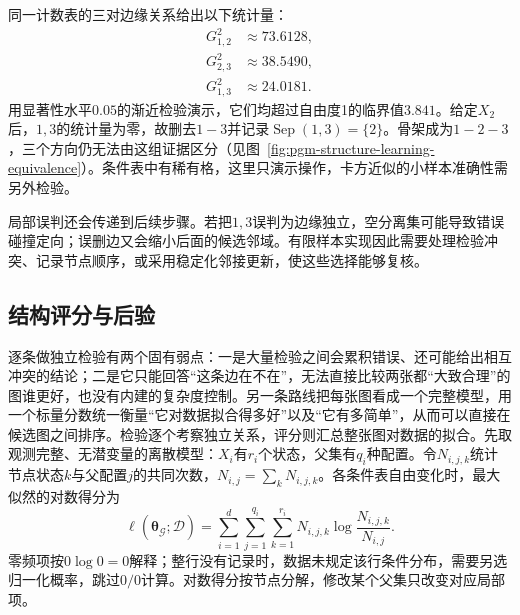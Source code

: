 同一计数表的三对边缘关系给出以下统计量：
\[
  \begin{aligned}
    G^2_{1,2}&\approx73.6128,\\
    G^2_{2,3}&\approx38.5490,\\
    G^2_{1,3}&\approx24.0181.
  \end{aligned}
\]
用显著性水平$0.05$的渐近检验演示，它们均超过自由度1的临界值$3.841$。给定$X_2$后，$1,3$的统计量为零，故删去$1-3$并记录$\operatorname{Sep}(1,3)=\{2\}$。骨架成为$1-2-3$，三个方向仍无法由这组证据区分（见图~\ref{fig:pgm-structure-learning-equivalence}）。条件表中有稀有格，这里只演示操作，卡方近似的小样本准确性需另外检验。

局部误判还会传递到后续步骤。若把$1,3$误判为边缘独立，空分离集可能导致错误碰撞定向；误删边又会缩小后面的候选邻域。有限样本实现因此需要处理检验冲突、记录节点顺序，或采用稳定化邻接更新，使这些选择能够复核。

\subsection{结构评分与后验}
\label{sec:pgm-structure-learning-scores}

逐条做独立检验有两个固有弱点：一是大量检验之间会累积错误、还可能给出相互冲突的结论；二是它只能回答“这条边在不在”，无法直接比较两张都“大致合理”的图谁更好，也没有内建的复杂度控制。另一条路线把每张图看成一个完整模型，用一个标量分数统一衡量“它对数据拟合得多好”以及“它有多简单”，从而可以直接在候选图之间排序。检验逐个考察独立关系，评分则汇总整张图对数据的拟合。先取观测完整、无潜变量的离散模型：$X_i$有$r_i$个状态，父集有$q_i$种配置。令$N_{i,j,k}$统计节点状态$k$与父配置$j$的共同次数，$N_{i,j}=\sum_kN_{i,j,k}$。各条件表自由变化时，最大似然的对数得分为
\begin{equation}
  \ell(\widehat{\bm{\theta}}_{\mathcal{G}};\mathcal{D})
  =\sum_{i=1}^{d}\sum_{j=1}^{q_i}\sum_{k=1}^{r_i}
    N_{i,j,k}\log\frac{N_{i,j,k}}{N_{i,j}}.
  \label{eq:pgm-structure-learning-local-likelihood}
\end{equation}
零频项按$0\log0=0$解释；整行没有记录时，数据未规定该行条件分布，需要另选归一化概率，跳过$0/0$计算。对数得分按节点分解，修改某个父集只改变对应局部项。

